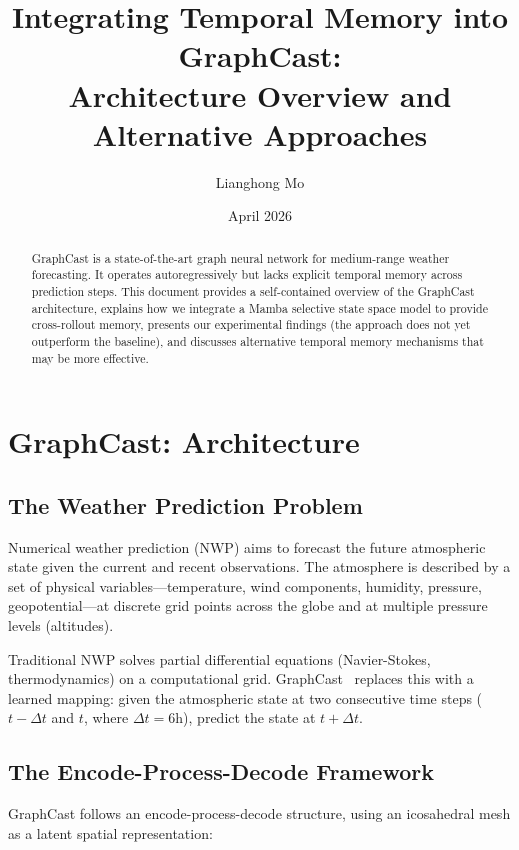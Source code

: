 \documentclass[11pt,a4paper]{article}
\title{Integrating Temporal Memory into GraphCast:\\Architecture Overview and Alternative Approaches}
\author{Lianghong Mo}
\date{April 2026}
\begin{document}
\maketitle

\begin{abstract}
GraphCast is a state-of-the-art graph neural network for medium-range weather forecasting. It operates autoregressively but lacks explicit temporal memory across prediction steps. This document provides a self-contained overview of the GraphCast architecture, explains how we integrate a Mamba selective state space model to provide cross-rollout memory, presents our experimental findings (the approach does not yet outperform the baseline), and discusses alternative temporal memory mechanisms that may be more effective.
\end{abstract}

\tableofcontents
\newpage

\section{GraphCast: Architecture}

\subsection{The Weather Prediction Problem}

Numerical weather prediction (NWP) aims to forecast the future atmospheric state given the current and recent observations. The atmosphere is described by a set of physical variables---temperature, wind components, humidity, pressure, geopotential---at discrete grid points across the globe and at multiple pressure levels (altitudes).

Traditional NWP solves partial differential equations (Navier-Stokes, thermodynamics) on a computational grid. GraphCast~\cite{lam2023graphcast} replaces this with a learned mapping: given the atmospheric state at two consecutive time steps ($t{-}\Delta t$ and $t$, where $\Delta t = 6\text{h}$), predict the state at $t{+}\Delta t$.

\subsection{The Encode-Process-Decode Framework}

GraphCast follows an encode-process-decode structure, using an icosahedral mesh as a latent spatial representation:
\end{document}
